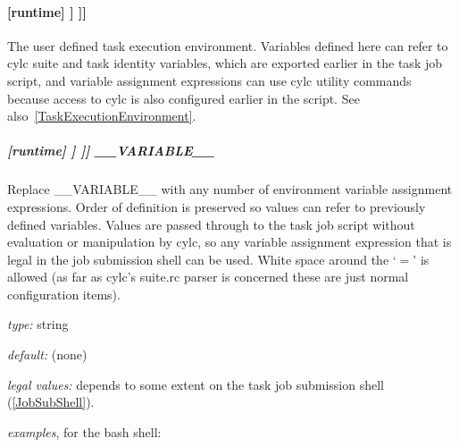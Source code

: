 \paragraph[{[[[}environment{]]]}]{[runtime] \textrightarrow [[\_\_NAME\_\_]] \textrightarrow [[[environment]]]}

The user defined task execution environment. Variables defined here can
refer to cylc suite and task identity variables, which are exported
earlier in the task job script, and variable assignment expressions can
use cylc utility commands because access to cylc is also configured
earlier in the script.  See also~\ref{TaskExecutionEnvironment}.

\subparagraph[\_\_VARIABLE\_\_ ]{[runtime] \textrightarrow [[\_\_NAME\_\_]] \textrightarrow [[[environment]]] \textrightarrow \_\_VARIABLE\_\_}
\label{AppendixTaskExecutionEnvironment}

Replace \_\_VARIABLE\_\_ with any number of environment variable
assignment expressions.
Order of definition is preserved so values can refer to previously
defined variables. Values are passed through to the task job script
without evaluation or manipulation by cylc, so any variable assignment
expression that is legal in the job submission shell can be used.
White space around the `$=$' is allowed (as far as cylc's suite.rc
parser is concerned these are just normal configuration items).

\begin{myitemize}
\item {\em type:} string
\item {\em default:} (none)
\item {\em legal values:} depends to some extent on the task job
    submission shell (\ref{JobSubShell}).
\item {\em examples}, for the bash shell:
\end{myitemize}

